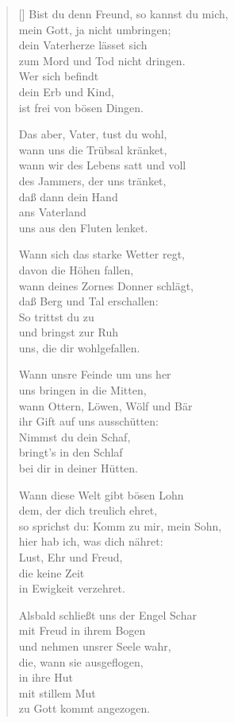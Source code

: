 \begin{multicols}{2}
\begin{verse}[\versewidth]
 Bist du denn Freund, so kannst du mich,\\
mein Gott, ja nicht umbringen;\\
dein Vaterherze lässet sich\\
zum Mord und Tod nicht dringen.\\
Wer sich befindt\\
dein Erb und Kind,\\
ist frei von bösen Dingen.

 Das aber, Vater, tust du wohl,\\
wann uns die Trübsal kränket,\\
wann wir des Lebens satt und voll\\
des Jammers, der uns tränket,\\
daß dann dein Hand\\
ans Vaterland\\
uns aus den Fluten lenket.

 Wann sich das starke Wetter regt,\\
davon die Höhen fallen,\\
wann deines Zornes Donner schlägt,\\
daß Berg und Tal erschallen:\\
So trittst du zu\\
und bringst zur Ruh\\
uns, die dir wohlgefallen.

 Wann unsre Feinde um uns her\\
uns bringen in die Mitten,\\
wann Ottern, Löwen, Wölf und Bär\\
ihr Gift auf uns ausschütten:\\
Nimmst du dein Schaf,\\
bringt's in den Schlaf\\
bei dir in deiner Hütten.

 Wann diese Welt gibt bösen Lohn\\
dem, der dich treulich ehret,\\
so sprichst du: Komm zu mir, mein Sohn,\\
hier hab ich, was dich nähret:\\
Lust, Ehr und Freud,\\
die keine Zeit\\
in Ewigkeit verzehret.

 Alsbald schließt uns der Engel Schar\\
mit Freud in ihrem Bogen\\
und nehmen unsrer Seele wahr,\\
die, wann sie ausgeflogen,\\
in ihre Hut\\
mit stillem Mut\\
zu Gott kommt angezogen.


\end{verse}
\end{multicols}
